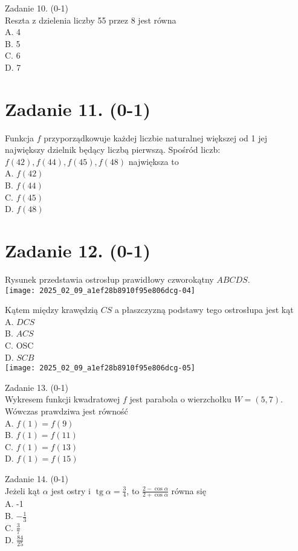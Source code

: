\documentclass[10pt]{article}
\begin{document}
Zadanie 10. (0-1)\\
Reszta z dzielenia liczby 55 przez 8 jest równa\\
A. 4\\
B. 5\\
C. 6\\
D. 7

\section*{Zadanie 11. (0-1)}
Funkcja \(f\) przyporządkowuje każdej liczbie naturalnej większej od 1 jej największy dzielnik będący liczbą pierwszą. Spośród liczb: \(f(42), f(44), f(45), f(48)\) największa to\\
A. \(f(42)\)\\
B. \(f(44)\)\\
C. \(f(45)\)\\
D. \(f(48)\)

\section*{Zadanie 12. (0-1)}
Rysunek przedstawia ostrosłup prawidłowy czworokątny \(A B C D S\).\\
\texttt{[image: 2025\_02\_09\_a1ef28b8910f95e806dcg-04]}

Kątem między krawędzią \(C S\) a płaszczyzną podstawy tego ostrosłupa jest kąt\\
A. \(D C S\)\\
B. \(A C S\)\\
C. OSC\\
D. \(S C B\)\\
\texttt{[image: 2025\_02\_09\_a1ef28b8910f95e806dcg-05]}

Zadanie 13. (0-1)\\
Wykresem funkcji kwadratowej \(f\) jest parabola o wierzchołku \(W=(5,7)\). Wówczas prawdziwa jest równość\\
A. \(f(1)=f(9)\)\\
B. \(f(1)=f(11)\)\\
C. \(f(1)=f(13)\)\\
D. \(f(1)=f(15)\)

Zadanie 14. (0-1)\\
Jeżeli kąt \(\alpha\) jest ostry i \(\operatorname{tg} \alpha=\frac{3}{4}\), to \(\frac{2-\cos \alpha}{2+\cos \alpha}\) równa się\\
A. -1\\
B. \(-\frac{1}{3}\)\\
C. \(\frac{3}{7}\)\\
D. \(\frac{84}{25}\)
\end{document}
